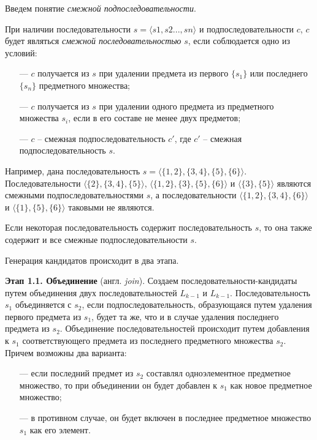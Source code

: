 Введем понятие \textit{смежной подпоследовательности}.

При наличии последовательности $s = \langle s1, s2..., sn \rangle$ и подпоследовательности $c$, $c$ будет являться \textit{смежной последовательностью} $s$, если соблюдается одно из условий:
\begin{itemize}
	\item[---] $c$ получается из $s$ при удалении предмета из первого $\{s_1\}$ или последнего $\{s_n\}$ предметного множества;
	\item[---] $c$ получается из $s$ при удалении одного предмета из предметного множества $s_i$, если в его составе не менее двух предметов;
	\item[---] $c$ – смежная подпоследовательность $c'$, где $c'$ – смежная подпоследовательность $s$.
\end{itemize}

Например, дана последовательность $s = \langle\{1,2\},\{3,4\},\{5\},\{6\}\rangle$. Последовательности $\langle\{2\},\{3,4\},\{5\}\rangle$, $\langle\{1,2\},\{3\},\{5\},\{6\}\rangle$ и $\langle\{3\},\{5\}\rangle$ являются смежными подпоследовательностями $s$, а последовательности $\langle\{1,2\},\{3,4\},\{6\}\rangle$ и $\langle\{1\},\{5\},\{6\}\rangle$ таковыми не являются.

Если некоторая последовательность содержит последовательность $s$, то она также содержит и все смежные подпоследовательности $s$.

Генерация кандидатов происходит в два этапа.

\textbf{Этап 1.1. Объединение} (англ. \textit{join}). Создаем последовательности-кандидаты путем объединения двух последовательностей $L_{k−1}$ и $L_{k−1}$. Последовательность $s_1$ объединяется с $s_2$, если подпоследовательность, образующаяся путем удаления первого предмета из $s_1$, будет та же, что и в случае удаления последнего предмета из $s_2$. Объединение последовательностей происходит путем добавления к $s_1$ соответствующего предмета из последнего предметного множества $s_2$. Причем возможны два варианта:
\begin{itemize}
	\item[---] если последний предмет из $s_2$ составлял одноэлементное предметное множество, то при объединении он будет добавлен к $s_1$ как новое предметное множество;
	\item[---] в противном случае, он будет включен в последнее предметное множество $s_1$ как его элемент.
\end{itemize}

